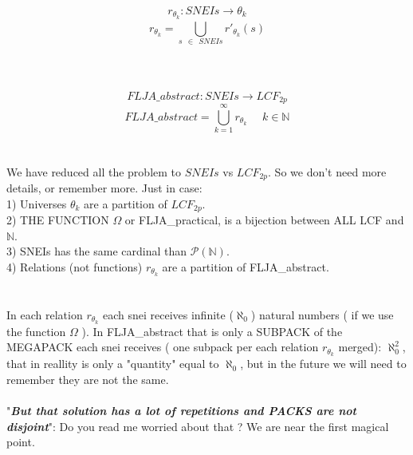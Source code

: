 	\noindent
	$$r_{\theta_{k}}: SNEIs \rightarrow \theta_{k}$$
	\[ r_{\theta_{k}} = \bigcup_{s \:\: \in \:\: SNEIs}^{} r'_{\theta_{k}}(s) \] \\
	\\\\
	
	\noindent
	$$ FLJA\_abstract: SNEIs \rightarrow LCF_{2p} $$
	\[ FLJA\_abstract = \bigcup_{k=1}^{\infty} r_{\theta_{k}} \:\:\:\:\:\: k \in \mathbb{N} \]
	\\\\
	
	\noindent
	We have reduced all the problem to $SNEIs$ vs $LCF_{2p}$. So we don't need more details, or remember more. Just in case:\\
	1) Universes $\theta_{k}$ are a  partition of $LCF_{2p}$.\\
	2) THE FUNCTION $\Omega$ or FLJA\_practical, is a bijection between ALL LCF and $\mathbb{N}$.\\
	3) SNEIs has the same cardinal than $\mathcal{P}(\mathbb{N})$.\\
	4) Relations (not functions) $r_{\theta_{k}}$ are a partition of FLJA\_abstract.\\
	\\\\
	
	\noindent
	In each relation $r_{\theta_{k}}$ each snei receives infinite ($\aleph_{0}$) natural numbers ( if we use the function $\Omega$ ). In FLJA\_abstract that is only a SUBPACK of the MEGAPACK each snei receives ( one subpack per each relation $r_{\theta_{k}}$ merged): $\aleph_{0}^{2}$, that in reallity is only a "quantity" equal to $\aleph_{0}$, but in the future we will need to remember they are not the same.
	\\\\
	
	\noindent
	"\textbf{\textit{But that solution has a lot of repetitions and PACKS are not disjoint}}": Do you read me worried about that ? We are near the first magical point.
	\\\\
	
	
